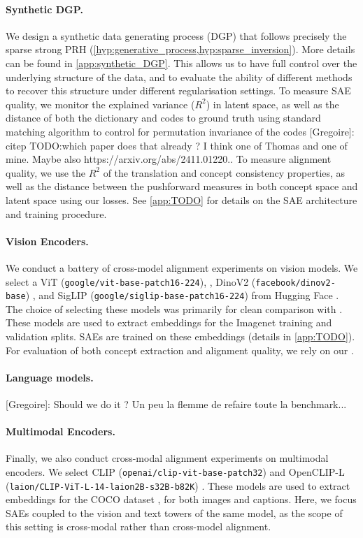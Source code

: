 \documentclass{article}
\newcommand{\greg}[1]{{\color{indigo}[Gregoire]: #1}}
\begin{document}
\paragraph{Synthetic DGP.} We design a synthetic data generating process (DGP) that follows precisely the sparse strong PRH (\cref{hyp:generative_process,hyp:sparse_inversion}). More details can be found in \cref{app:synthetic_DGP}. This allows us to have full control over the underlying structure of the data, and to evaluate the ability of different methods to recover this structure under different regularisation settings. To measure SAE quality, we monitor the explained variance ($R^2$) in latent space, as well as the distance of both the dictionary and codes to ground truth using standard matching algorithm to control for permutation invariance of the codes \greg{citep TODO:which paper does that already ? I think one of Thomas and one of mine. Maybe also https://arxiv.org/abs/2411.01220.}. To measure alignment quality, we use the $R^2$ of the translation and concept consistency properties, as well as the distance between the pushforward measures in both concept space and latent space using our losses. See \cref{app:TODO} for details on the SAE architecture and training procedure.

\paragraph{Vision Encoders.} We conduct a battery of cross-model alignment experiments on vision models. We select a ViT ({\verb "google/vit-base-patch16-224"}), \citep{TODO}, DinoV2 ({\verb "facebook/dinov2-base"}) \citep{TODO}, and SigLIP ({\verb "google/siglip-base-patch16-224"}) \citep{TODO} from Hugging Face \citep{TODO:citeHF?}. The choice of selecting these models was primarily for clean comparison with \citet{USAE}. These models are used to extract embeddings for the Imagenet training and validation splits. SAEs are trained on these embeddings (details in \cref{app:TODO}). For evaluation of both concept extraction and alignment quality, we rely on our \InterVenchA.

\paragraph{Language models.} \greg{Should we do it ? Un peu la flemme de refaire toute la benchmark...}

\paragraph{Multimodal Encoders.} Finally, we also conduct cross-modal alignment experiments on multimodal encoders. We select CLIP ({\verb "openai/clip-vit-base-patch32"}) \citep{TODO:CLIP} and OpenCLIP-L ({\verb "laion/CLIP-ViT-L-14-laion2B-s32B-b82K"}) \citep{TODO:OpenCLIP}. These models are used to extract embeddings for the COCO dataset \citep{TODO}, for both images and captions. Here, we focus SAEs coupled to the vision and text towers of the same model, as the scope of this setting is cross-modal rather than cross-model alignment.
\end{document}
